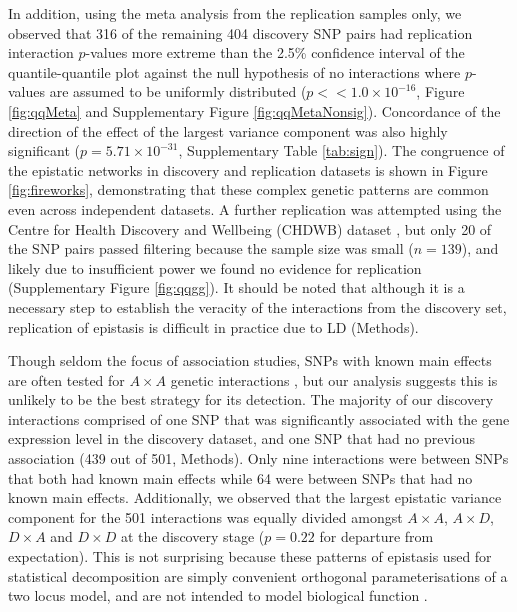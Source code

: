 \documentclass{article}
\begin{document}
In addition, using the meta analysis from the replication samples only, we observed that 316 of the remaining 404 discovery SNP pairs had replication interaction $p$-values more extreme than the 2.5\% confidence interval of the quantile-quantile plot against the null hypothesis of no interactions where $p$-values are assumed to be uniformly distributed ($p << 1.0 \times 10^{-16}$, Figure \ref{fig:qqMeta} and Supplementary Figure \ref{fig:qqMetaNonsig}). Concordance of the direction of the effect of the largest variance component was also highly significant ($p = 5.71 \times 10^{-31}$, Supplementary Table \ref{tab:sign}). The congruence of the epistatic networks in discovery and replication datasets is shown in Figure \ref{fig:fireworks}, demonstrating that these complex genetic patterns are common even across independent datasets. A further replication was attempted using the Centre for Health Discovery and Wellbeing (CHDWB) dataset \cite{Preininger2013}, but only 20 of the SNP pairs passed filtering because the sample size was small ($n=139$), and likely due to insufficient power we found no evidence for replication (Supplementary Figure \ref{fig:qqgg}). It should be noted that although it is a necessary step to establish the veracity of the interactions from the discovery set, replication of epistasis is difficult in practice due to LD (Methods).


Though seldom the focus of association studies, SNPs with known main effects are often tested for $A \times A$ genetic interactions \cite{Cordell2009}, but our analysis suggests this is unlikely to be the best strategy for its detection. The majority of our discovery interactions comprised of one SNP that was significantly associated with the gene expression level in the discovery dataset, and one SNP that had no previous association \cite{Powell2013} (439 out of 501, Methods). Only nine interactions were between SNPs that both had known main effects while 64 were between SNPs that had no known main effects. Additionally, we observed that the largest epistatic variance component for the 501 interactions was equally divided amongst $A \times A$, $A \times D$, $D \times A$ and $D \times D$ at the discovery stage ($p = 0.22$ for departure from expectation). This is not surprising because these patterns of epistasis used for statistical decomposition are simply convenient orthogonal parameterisations of a two locus model, and are not intended to model biological function \cite{Cockerham1954}.
\end{document}
